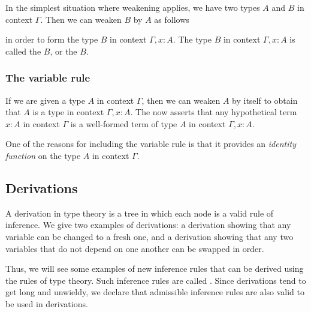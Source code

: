 In the simplest situation where weakening applies, we have two types $A$ and $B$ in context $\Gamma$. Then we can weaken $B$ by $A$ as follows
\begin{prooftree}
\end{prooftree}
in order to form the type $B$ in context $\Gamma,x:A$. The type $B$ in context $\Gamma,x:A$ is called the  $B$, or the  $B$.

\subsubsection*{The variable rule}
If we are given a type $A$ in context $\Gamma$, then we can weaken $A$ by itself to obtain that $A$ is a type in context $\Gamma,x:A$. The  now asserts that any hypothetical term $x:A$ in context $\Gamma$ is a well-formed term of type $A$ in context $\Gamma,x:A$.
\begin{prooftree}
\end{prooftree}
One of the reasons for including the variable rule is that it provides an \emph{identity function} on the type $A$ in context $\Gamma$.

\subsection{Derivations}\label{sec:derivations}

A derivation in type theory is a tree in which each node is a valid rule of inference. We give two examples of derivations: a derivation showing that any variable can be changed to a fresh one, and a derivation showing that any two variables that do not depend on one another can be swapped in order.

Thus, we will see some examples of new inference rules that can be derived using the rules of type theory. Such inference rules are called . Since derivations tend to get long and unwieldy, we declare that admissible inference rules are also valid to be used in derivations.

